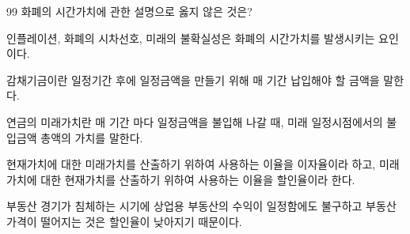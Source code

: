 \begin{question}{99}
화폐의 시간가치에 관한 설명으로 옳지 않은 것은?
\begin{choices}
  \item 인플레이션, 화폐의 시차선호, 미래의 불확실성은 화폐의 시간가치를 발생시키는 요인이다.
  \item 감채기금이란 일정기간 후에 일정금액을 만들기 위해 매 기간 납입해야 할 금액을 말한다.
  \item 연금의 미래가치란 매 기간 마다 일정금액을 불입해 나갈 때, 미래 일정시점에서의 불입금액 총액의 가치를 말한다.
  \item 현재가치에 대한 미래가치를 산출하기 위하여 사용하는 이율을 이자율이라 하고, 미래가치에 대한 현재가치를 산출하기 위하여 사용하는 이율을 할인율이라 한다.
  \item 부동산 경기가 침체하는 시기에 상업용 부동산의 수익이 일정함에도 불구하고 부동산 가격이 떨어지는 것은 할인율이 낮아지기 때문이다.
\end{choices}
\end{question}
